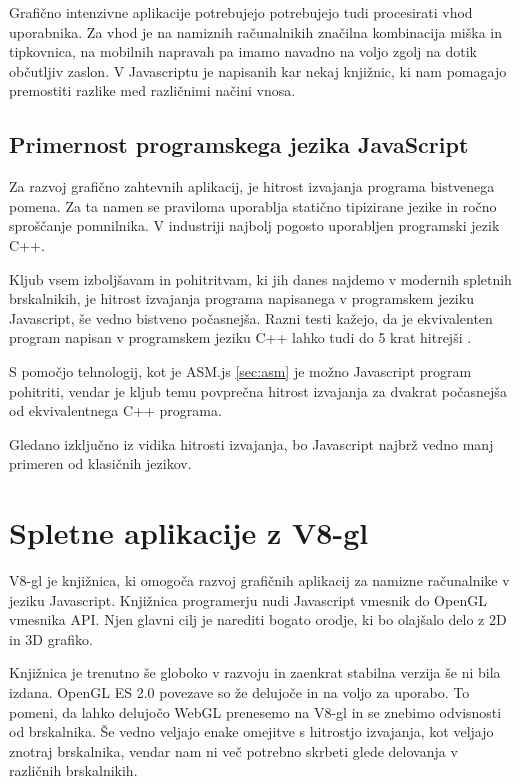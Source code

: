 Grafično intenzivne aplikacije potrebujejo potrebujejo tudi procesirati vhod uporabnika. Za vhod je na namiznih računalnikih značilna kombinacija miška in tipkovnica, na mobilnih napravah pa imamo navadno na voljo zgolj na dotik občutljiv zaslon. V Javascriptu je napisanih kar nekaj knjižnic, ki nam pomagajo premostiti razlike med različnimi načini vnosa.

\subsection{Primernost programskega jezika JavaScript}

Za razvoj grafično zahtevnih aplikacij, je hitrost izvajanja programa bistvenega pomena. Za ta namen se praviloma uporablja statično tipizirane jezike in ročno sproščanje pomnilnika. V industriji najbolj pogosto uporabljen programski jezik C++.

Kljub vsem izboljšavam in pohitritvam, ki jih danes najdemo v modernih spletnih brskalnikih, je hitrost izvajanja programa napisanega v programskem jeziku Javascript, še vedno bistveno počasnejša. Razni testi kažejo, da je ekvivalenten program napisan v programskem jeziku C++ lahko tudi do 5 krat hitrejši \cite{jsperformance}.

S pomočjo tehnologij, kot je ASM.js \ref{sec:asm} je možno Javascript program pohitriti, vendar je kljub temu povprečna hitrost izvajanja za dvakrat počasnejša od ekvivalentnega C++ programa.

Gledano izključno iz vidika hitrosti izvajanja, bo Javascript najbrž vedno manj primeren od klasičnih jezikov.

\section{Spletne aplikacije z V8-gl}

V8-gl \cite{v8gl} je knjižnica, ki omogoča razvoj grafičnih aplikacij za namizne računalnike v jeziku Javascript. Knjižnica programerju nudi Javascript vmesnik do OpenGL vmesnika API. Njen glavni cilj je narediti bogato orodje, ki bo olajšalo delo z 2D in 3D grafiko.

Knjižnica je trenutno še globoko v razvoju in zaenkrat stabilna verzija še ni bila izdana. OpenGL ES 2.0 povezave so že delujoče in na voljo za uporabo. To pomeni, da lahko delujočo WebGL prenesemo na V8-gl in se znebimo odvisnosti od brskalnika. Še vedno veljajo enake omejitve s hitrostjo izvajanja, kot veljajo znotraj brskalnika, vendar nam ni več potrebno skrbeti glede delovanja v različnih brskalnikih.

